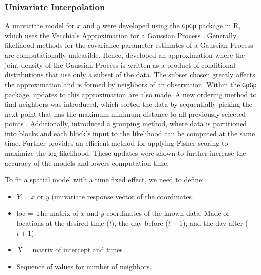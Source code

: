 \documentclass[12pt]{article}
\providecommand{\tightlist}{%
  \setlength{\itemsep}{0pt}\setlength{\parskip}{0pt}}
\begin{document}
\hypertarget{univariate-interpolation}{%
\subsubsection{Univariate
Interpolation}\label{univariate-interpolation}}

A univariate model for \(x\) and \(y\) were developed using the
\texttt{GpGp} package in R, which uses the Vecchia's Approximation for a
Gaussian Process \citep{gpgp_pkg}. Generally, likelihood methods for the
covariance parameter estimates of a Gaussian Process are computationally
unfeasible. Hence, \citet{vecchia1988estimation} developed an
approximation where the joint density of the Gaussian Process is written
as a product of conditional distributions that use only a subset of the
data. The subset chosen greatly affects the approximation and is formed
by neighbors of an observation. Within the \texttt{GpGp} package,
updates to this approximation are also made. A new ordering method to
find neighbors was introduced, which sorted the data by sequentially
picking the next point that has the maximum minimum distance to all
previously selected points \citep{guinness_permutation_2018}.
Additionally, \citet{guinness_permutation_2018} introduced a grouping
method, where data is partitioned into blocks and each block's input to
the likelihood can be computed at the same time. Further
\citet{guinness_gaussian_2019} provides an efficient method for applying
Fisher scoring to maximize the log-likelihood. These updates were shown
to further increase the accuracy of the models and lowers computation
time.

To fit a spatial model with a time fixed effect, we need to define:

\begin{itemize}
\tightlist
\item
  \(Y\) = \(x\) or \(y\) (univariate response vector of the coordinates.
\item
  loc = The matrix of \(x\) and \(y\) coordinates of the known data.
  Made of locations at the desired time (\(t\)), the day before
  (\(t-1\)), and the day after (\(t+1\)).
\item
  \(X\) = matrix of intercept and times
\item
  Sequence of values for number of neighbors.
\end{itemize}
\end{document}
